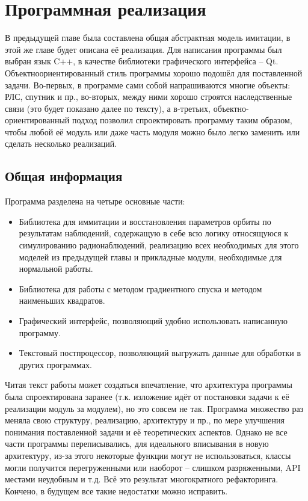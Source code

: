\chapter{Программная реализация} \label{ch:programm}
В предыдущей главе была составлена общая абстрактная модель имитации, в этой же главе будет описана её реализация.
Для написания программы был выбран язык C++, в качестве библиотеки графического интерфейса -- Qt.
Объектноориентированный стиль программы хорошо подошёл для поставленной задачи. 
Во-первых, в программе сами собой напрашиваются многие объекты: РЛС, спутник и пр., во-вторых, между ними хорошо
строятся наследственные связи (это будет показано далее по тексту), а в-третьих, объектно-ориентированный подход
позволил спроектировать программу таким образом, чтобы любой её модуль или даже часть модуля
можно было легко заменить или сделать несколько реализаций.

\section{Общая информация}

Программа разделена на четыре основные части:
\begin{itemize}
	\item Библиотека для иммитации и восстановления параметров орбиты по результатам наблюдений, содержащую в
			себе всю логику относящуюся к симулированию радионаблюдений, реализацию всех необходимых для этого
			моделей из предыдущей главы и прикладные модули, необходимые для
			нормальной работы.
	\item Библиотека для работы с методом градиентного спуска и методом наименьших квадратов.
	\item Графический интерфейс, позволяющий удобно использовать написанную программу.
	\item Текстовый постпроцессор, позволяющий выгружать данные для обработки в других программах.
\end{itemize}

Читая текст работы может создаться впечатление, что архитектура программы была спроектирована заранее (т.к.
изложение идёт от постановки задачи к её реализации модуль за модулем), но это совсем не так. Программа множество
раз меняла свою структуру, реализацию, архитектуру и пр., по мере улучшения понимания поставленной задачи и её
теоретических аспектов. Однако не все части программы переписывались, для идеального вписывания в новую архитектуру,
из-за этого некоторые функции могут не использоваться, классы могли получится перегруженными или наоборот --
слишком разряженными, API местами неудобным и т.д. Всё это результат многократного рефакторинга. 
Кончено, в будущем все такие недостатки можно исправить.

